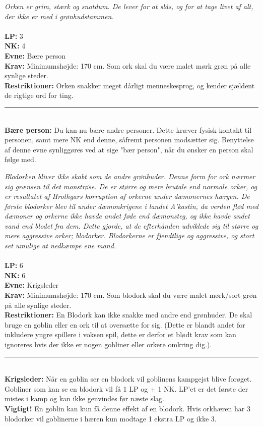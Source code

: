 \begin{race*}[Ork]
\textit{Orken er grim, stærk og snotdum. De lever for at slås, og for at tage livet af alt, der ikke er med i grønhudstammen.}\\
\\
\textbf{LP:} 3\\ 
\textbf{NK:} 4\\ 
\textbf{Evne:} Bære person\\
\textbf{Krav:} Minimumshøjde: 170 cm. Som ork skal du være malet mørk grøn på alle synlige steder.\\
\textbf{Restriktioner:} Orken snakker meget dårligt menneskesprog, og kender sjældent de rigtige ord for ting.\\
\rule{\textwidth}{0.4pt}\\
\textbf{Bære person:} Du kan nu bære andre personer. Dette kræver fysisk kontakt til personen, samt mere NK end denne, såfremt personen modsætter sig. Benyttelse af denne evne synliggøres ved at sige "bær person", når du ønsker en person skal følge med.\\
\end{race*}

\begin{race*}
\textit{Blodorken bliver ikke skabt som de andre grønhuder. Denne form for ork nærmer sig grænsen til det monstrøse. De er større og mere brutale end normale orker, og er resultatet af Hrothgars korruption af orkerne under dæmonernes hærgen. De første blodorker blev til under dæmonkrigene i landet A’kastin, da verden flød med dæmoner og orkerne ikke havde andet føde end dæmonsteg, og ikke havde andet vand end blodet fra dem. Dette gjorde, at de efterhånden udviklede sig til større og mere aggressive orker; blodorker. Blodorkerne er fjendtlige og aggressive, og stort set umulige at nedkæmpe ene mand.}\\
\\
\textbf{LP:} 6\\ 
\textbf{NK:} 6\\ 
\textbf{Evne:} Krigsleder\\
\textbf{Krav:} Minimumshøjde: 170 cm. Som blodork skal du være malet mørk/sort grøn på alle synlige steder.\\
\textbf{Restriktioner:} En Blodork kan ikke snakke med andre end grønhuder. De skal bruge en goblin eller en ork til at oversætte for sig. (Dette er blandt andet for inkludere yngre spillere i voksen spil, dette er derfor et blødt krav som kan ignoreres hvis der ikke er nogen gobliner eller orkere omkring dig.).\\
\rule{\textwidth}{0.4pt}\\
\textbf{Krigsleder:} Når en goblin ser en blodork vil goblinens kampgejst blive forøget. Gobliner som kan se en blodork vil få 1 LP og + 1 NK. LP’et er det første der mistes i kamp og kan ikke genvindes før næste slag.\\
\textbf{Vigtigt!} En goblin kan kun få denne effekt af en blodork. Hvis orkhæren har 3 blodorker vil goblinerne i hæren kun modtage 1 ekstra LP og ikke 3.\\
\end{race*}

